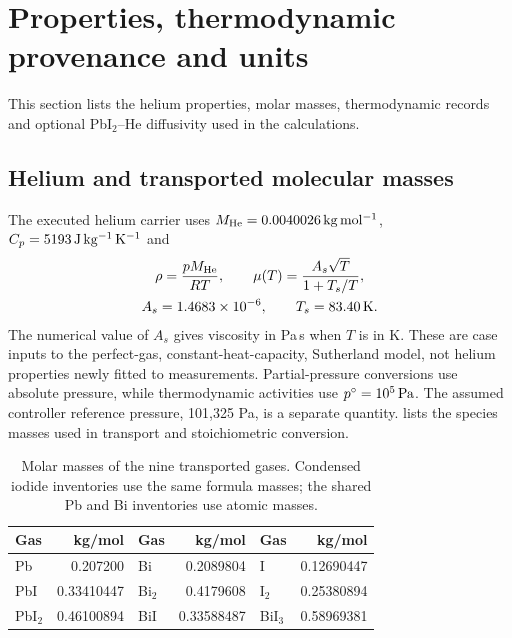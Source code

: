 \section{Properties, thermodynamic provenance and units}
\label{app:properties}
This section lists the helium properties, molar masses, thermodynamic
records and optional PbI$_2$--He diffusivity used in the calculations.

\subsection{Helium and transported molecular masses}
The executed helium carrier uses
$M_{\rm He}=0.0040026\,\mathrm{kg\,mol^{-1}}$,
$C_p=5193\,\mathrm{J\,kg^{-1}\,K^{-1}}$ and
\begin{equation}
 \begin{gathered}
 \rho=\frac{pM_{\rm He}}{RT},\qquad
 \mu(T)=\frac{A_s\sqrt T}{1+T_s/T},\\
 A_s=1.4683\times10^{-6},\qquad T_s=83.40\,\mathrm{K}.
 \end{gathered}
\end{equation}
The numerical value of $A_s$ gives viscosity in Pa\,s when $T$ is in K.
These are case inputs to the perfect-gas, constant-heat-capacity,
Sutherland model, not helium properties newly fitted to measurements.
Partial-pressure conversions use absolute pressure, while
thermodynamic activities use $p^\circ=10^5\,\mathrm{Pa}$. The assumed
controller reference pressure, 101,325 Pa, is a separate quantity.
 lists the species masses used in transport and
stoichiometric conversion.
\begin{table}[htbp]
\centering
\caption{Molar masses of the nine transported gases. Condensed iodide
inventories use the same formula masses; the shared Pb and Bi
inventories use atomic masses.}
\label{tab:masses}
\begin{tabular}{lr@{\qquad}lr@{\qquad}lr}
\toprule
Gas & kg/mol & Gas & kg/mol & Gas & kg/mol \\
\midrule
Pb & 0.207200 & Bi & 0.2089804 & I & 0.12690447 \\
PbI & 0.33410447 & Bi$_2$ & 0.4179608 & I$_2$ & 0.25380894 \\
PbI$_2$ & 0.46100894 & BiI & 0.33588487 & BiI$_3$ & 0.58969381 \\
\bottomrule
\end{tabular}
\end{table}

